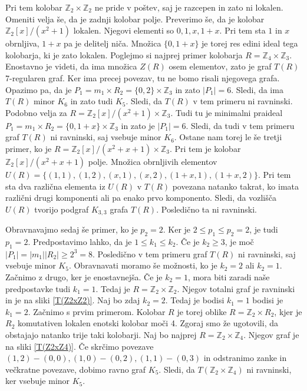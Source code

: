 \documentclass[a4paper, 12pt]{amsart}
\theoremstyle{definition} %
\theoremstyle{plain} %
\newcommand{\Z}{\mathbb Z}
\begin{document}
\begin{enumerate}
Pri tem kolobar $\Z_2 \times \Z_2$ ne pride v poštev, saj je razcepen in zato ni lokalen. Omeniti velja še, da je zadnji kolobar polje. Preverimo še, da je kolobar $\Z_2[x]/(x^2 + 1)$ lokalen. Njegovi elementi so $0,1,x,1+x$. Pri tem sta $1$ in $x$ obrnljiva, $1+x$ pa je delitelj niča. Množica $\{0,1+x\}$ je torej res edini ideal tega kolobarja, ki je zato lokalen. Poglejmo si najprej primer kolobarja $R=\Z_4 \times \Z_3$. Enostavno je videti, da ima množica $Z(R)$  osem elementov, zato je graf $T(R)$ 7-regularen graf. Ker ima precej povezav, tu ne bomo risali njegovega grafa. Opazimo pa, da je $P_1 = m_1 \times R_2 = 	\{0,2\} \times \Z_3$ in zato $|P_1| = 6$. Sledi, da ima $T(R)$ minor $K_6$ in zato tudi $K_5$. Sledi, da $T(R)$ v tem primeru ni ravninski. Podobno velja za $R = \Z_2[x]/(x^2 +1) \times \Z_3$. Tudi tu je minimalni praideal $P_1 = m_1 \times R_2 = \{0,1+x\} \times \Z_3$ in zato je $|P_1| = 6$. Sledi, da tudi v tem primeru graf $T(R)$ ni ravninski, saj vsebuje minor $K_6$. Ostane nam torej le še tretji primer, ko je $R = \Z_2[x]/(x^2 + x + 1) \times \Z_3$. Pri tem je kolobar $\Z_2[x]/(x^2 + x+1)$ polje. Množica obrnljivih elementov $U(R) = \{(1,1),(1,2),(x,1),(x,2),(1+x,1),(1+x,2)\}$. Pri tem sta dva različna elementa iz $U(R)$ v $T(R)$ povezana natanko takrat, ko imata različni drugi komponenti ali pa enako prvo komponento. Sledi, da vozlišča $U(R)$ tvorijo podgraf $K_{3,3}$ grafa $T(R)$. Posledično ta ni ravninski.

Obravnavajmo sedaj še primer, ko  je $p_2 = 2$. Ker je $2 \le p_1 \le p_2 = 2$, je tudi $p_1=2$. Predpostavimo lahko, da je $1 \le k_1 \le k_2$. Če je $k_2 \ge 3$, je moč $|P_1|=|m_1||R_2| \ge 2^3 = 8$. Posledično v tem primeru graf $T(R)$ ni ravninski, saj vsebuje minor $K_5$. Obravnavati moramo še možnosti, ko je $k_2 =2$ ali $k_2 = 1$. Začnimo z drugo, ker je enostavnejša. Če je $k_2=1$, mora biti zaradi naše predpostavke tudi $k_1=1$. Tedaj je $R=\Z_2 \times \Z_2$. Njegov totalni graf je ravninski in je na sliki \ref{T(Z2xZ2)}. 
Naj bo zdaj $k_2 = 2$. Tedaj je bodisi $k_1=1$ bodisi je $k_1 = 2$. Začnimo s prvim primerom. Kolobar $R$ je torej oblike $R=\Z_2 \times R_2$, kjer je $R_2$ komutativen lokalen enotski kolobar moči 4. Zgoraj smo že ugotovili, da obstajajo natanko trije taki kolobarji. Naj bo najprej $R=\Z_2 \times \Z_4$. Njegov graf je na sliki \ref{T(Z2xZ4)}. Če skrčimo povezave $(1,2)-(0,0), (1,0)-(0,2), (1,1)-(0,3)$ in  odstranimo zanke in večkratne povezave, dobimo ravno graf $K_5$. Sledi, da $T(\Z_2 \times \Z_4)$ ni ravninski, ker vsebuje minor $K_5$. 


\end{enumerate}
\end{document}
